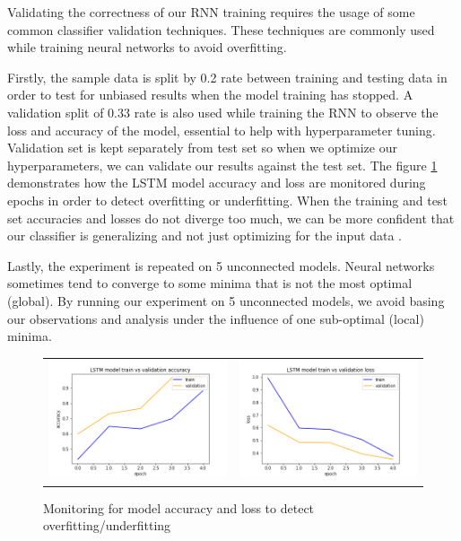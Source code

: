 Validating the correctness of our RNN training requires the usage of some common classifier validation techniques. These techniques are commonly used while training neural networks to avoid overfitting. 

Firstly, the sample data is split by 0.2 rate between training and testing data in order to test for unbiased results when the model training has stopped. A validation split of 0.33 rate is also used while training the RNN to observe the loss and accuracy of the model, essential to help with hyperparameter tuning. Validation set is kept separately from test set so when we optimize our hyperparameters, we can validate our results against the test set. The figure \ref{model-validation-monitoring} demonstrates how the LSTM model accuracy and loss are monitored during epochs in order to detect overfitting or underfitting. When the training and test set accuracies and losses do not diverge too much, we can be more confident that our classifier is generalizing and not just optimizing for the input data \cite{deep-learning-cookbook}.

Lastly, the experiment is repeated on 5 unconnected models. Neural networks sometimes tend to converge to some minima that is not the most optimal (global). By running our experiment on 5 unconnected models, we avoid basing our observations and analysis under the influence of one sub-optimal (local) minima. 

\begin{figure}
   \centering
\begin{tabular}{cc}
\includegraphics[width=7.5cm]{images/classifier/model-train-vs-validation-accuracy}&
\includegraphics[width=7.5cm]{images/classifier/model-train-vs-validation-loss}\\
\end{tabular}
    \caption{Monitoring for model accuracy and loss to detect overfitting/underfitting}
    \label{model-validation-monitoring}
\end{figure}

